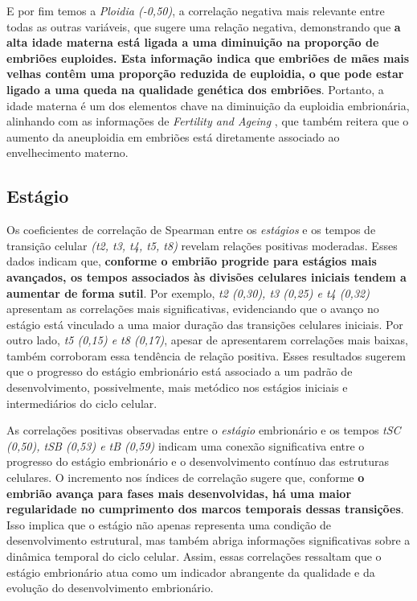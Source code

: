 \begin{figure}[h]
\begin{minipage}[b]{0.45\linewidth}
        \vspace{0.3cm}
        \begin{minipage}{\linewidth}
            \centering
        \end{minipage}
    \end{minipage}
\end{figure}
\FloatBarrier

E por fim temos a \textit{Ploidia (-0,50)}, a correlação negativa mais relevante entre todas as outras variáveis, que sugere uma relação negativa, demonstrando que \textbf{a alta idade materna está ligada a uma diminuição na proporção de embriões euploides. Esta informação indica que embriões de mães mais velhas contêm uma proporção reduzida de euploidia, o que pode estar ligado a uma queda na qualidade genética dos embriões}. Portanto, a idade materna é um dos elementos chave na diminuição da euploidia embrionária, alinhando com as informações de \textit{Fertility and Ageing} \cite{eshre2005}, que também reitera que o aumento da aneuploidia em embriões está diretamente associado ao envelhecimento materno.

\subsection*{Estágio}
Os coeficientes de correlação de Spearman entre os \textit{estágios} e os tempos de transição celular \textit{(t2, t3, t4, t5, t8)} revelam relações positivas moderadas. Esses dados indicam que, \textbf{conforme o embrião progride para estágios mais avançados, os tempos associados às divisões celulares iniciais tendem a aumentar de forma sutil}. Por exemplo, \textit{t2 (0,30), t3 (0,25) e t4 (0,32)} apresentam as correlações mais significativas, evidenciando que o avanço no estágio está vinculado a uma maior duração das transições celulares iniciais. Por outro lado, \textit{t5 (0,15) e t8 (0,17)}, apesar de apresentarem correlações mais baixas, também corroboram essa tendência de relação positiva. Esses resultados sugerem que o progresso do estágio embrionário está associado a um padrão de desenvolvimento, possivelmente, mais metódico nos estágios iniciais e intermediários do ciclo celular.

As correlações positivas observadas entre o \textit{estágio} embrionário e os tempos \textit{tSC (0,50), tSB (0,53) e tB (0,59)} indicam uma conexão significativa entre o progresso do estágio embrionário e o desenvolvimento contínuo das estruturas celulares. O incremento nos índices de correlação sugere que, conforme \textbf{o embrião avança para fases mais desenvolvidas, há uma maior regularidade no cumprimento dos marcos temporais dessas transições}. Isso implica que o estágio não apenas representa uma condição de desenvolvimento estrutural, mas também abriga informações significativas sobre a dinâmica temporal do ciclo celular. Assim, essas correlações ressaltam que o estágio embrionário atua como um indicador abrangente da qualidade e da evolução do desenvolvimento embrionário.

